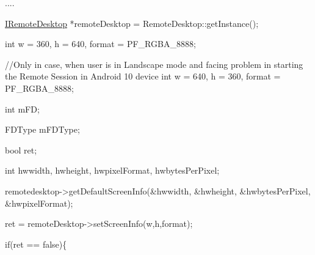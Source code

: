 \begin{DoxyPre}	 ....\end{DoxyPre}



\begin{DoxyPre}	 \hyperlink{classknoxremotedesktop_1_1IRemoteDesktop}{IRemoteDesktop} *remoteDesktop = RemoteDesktop::getInstance();\end{DoxyPre}



\begin{DoxyPre}	 int w = 360, h = 640, format = PF\_RGBA\_8888;\end{DoxyPre}



\begin{DoxyPre}	 //Only in case, when user is in Landscape mode and facing problem in starting the Remote Session in Android 10 device
	 int w = 640, h = 360, format = PF\_RGBA\_8888;\end{DoxyPre}



\begin{DoxyPre}	 int	  mFD;\end{DoxyPre}



\begin{DoxyPre}	 FDType   mFDType;\end{DoxyPre}



\begin{DoxyPre}	 bool ret;\end{DoxyPre}



\begin{DoxyPre}	 int	hwwidth, hwheight, hwpixelFormat, hwbytesPerPixel;\end{DoxyPre}



\begin{DoxyPre}	 remotedesktop->getDefaultScreenInfo(&hwwidth, &hwheight, &hwbytesPerPixel, &hwpixelFormat);\end{DoxyPre}



\begin{DoxyPre}	 ret = remoteDesktop->setScreenInfo(w,h,format);\end{DoxyPre}



\begin{DoxyPre}	 if(ret == false)\{\end{DoxyPre}



